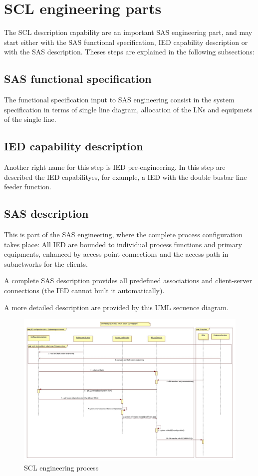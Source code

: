\section{SCL engineering parts} 
\label{sec:SCL-engineering-parts}
The SCL description capability are 
an important \gls{SAS} engineering part, and may
start either with the SAS functional specification, 
\gls{IED} capability description or with the 
\gls{SAS} description. Theses steps 
are explained 
in the following subsections: 

\subsection{SAS functional specification}
The functional specification input to \gls{SAS} engineering 
consist in the system specification in terms of 
single line diagram, allocation of the \glspl{LN} 
and equipmets of the single line.

\subsection{IED capability description}
Another right name for this step is IED pre-engineering. 
In this step are described the IED capabilityes, for 
example, a IED with the double busbar line feeder function.

\subsection{SAS description}
\label{sec:SAS-description-scl-engineering}
This is part of the \gls{SAS} engineering, where the 
complete process configuration takes place: All IED 
are bounded to individual process functions and primary 
equipments, enhanced by access point connections and 
the access path in subnetworks for the clients.

A complete \gls{SAS} description provides 
all predefined associations and client-server connections 
(the \gls{IED} cannot built it automatically).

A more detailed description are provided by this UML secuence diagram.

\begin{figure}
  \includegraphics[width=1.0\textwidth]{chapters/ch-scl/figures/SCL-development-process}
  \caption{SCL engineering process}
  \label{fig:SCL-development-process}
\end{figure}

